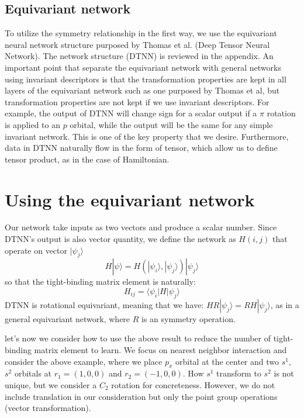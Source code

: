 \documentclass{article}
\begin{document}
\subsection{Equivariant network}
To utilize the symmetry relationship in the first way, we use the equivariant neural network
structure purposed by Thomas et al.\cite{thomas_tensor_2018} (Deep Tensor Neural Network). 
The network structure (DTNN) is reviewed in the appendix. 
An important point that separate the equivariant network with general networks using 
invariant descriptors is that the transformation properties are kept in all layers of the equivariant
network such as one purposed by Thomas et al, but transformation properties are not kept if we 
use invariant descriptors. For example, the output of DTNN will change sign for a scalar output  
if a $\pi$ rotation is applied to an $p$ orbital, while the output will be the same for any
simple invariant network. This is one of the key property that we desire.
Furthermore, data in DTNN naturally flow in the form of tensor, which allow us to define 
tensor product, as in the case of Hamiltonian.

\section{Using the equivariant network}
Our network take inputs as two vectors and produce a scalar number. Since DTNN's output is 
also vector quantity, we define the network as $H(i,j)$ that operate on vector $| \psi_j \rangle$
\begin{equation}
    H |\psi\rangle = H(| \psi_i \rangle,| \psi_j \rangle) | \psi_j \rangle
\end{equation}
so that the tight-binding matrix element is naturally:
\begin{equation}
    H_{ij} = \langle \psi_i | H | \psi_j \rangle
\end{equation}
DTNN is rotational equivariant, meaning that we have: $H R | \psi_j \rangle  = RH | \psi_j \rangle $, 
as in a general equivariant network, 
where $R$ is an symmetry operation. 

let's now we consider how to use the above result to reduce the number of 
tight-binding matrix element to learn. 
We focus on nearest neighbor interaction and consider the above example, where
we place $p_x$ orbital at the center and two $s^1$, $s^2$ orbitals at $r_1 = (1,0,0)$ and $r_2 = (-1,0,0)$. 
How $s^1$ transform to $s^2$ is not unique, but we consider a $C_2$ rotation for concreteness. 
However, we do not include translation in our consideration but only the point group 
operations (vector transformation). 
\end{document}
